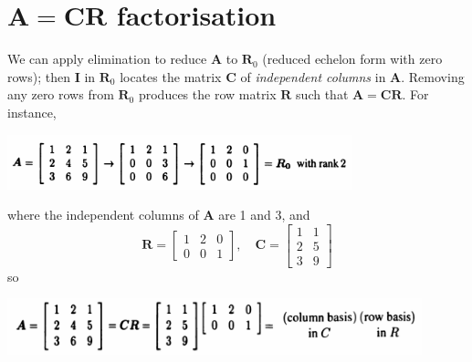 \documentclass{report}
\begin{document}
\section{$\bm A=\bm{CR}$ factorisation}
We can apply elimination to reduce $\bm A$ to $\bm R_0$ (reduced echelon form with zero rows); then 
$\bm I$ in $\bm R_0$ locates the matrix $\bm C$ of \textit{independent columns} in $\bm A$. Removing any zero rows from $\bm R_0$ produces 
the row matrix $\bm R$ such that $\bm A=\bm{CR}$. For instance, 
\begin{center}
\includegraphics[width=10cm]{30}
\end{center}
where the independent columns of $\bm A$ are 1 and 3, and
\begin{equation*}
\bm R=\left[\begin{array}{ccc}
1&2&0\\0&0&1
\end{array}\right],\quad
\bm C=\left[\begin{array}{cc}
1&1\\2&5\\3&9
\end{array}\right]
\end{equation*}
so
\begin{center}
\includegraphics[width=12cm]{29}
\end{center}
\newpage
\end{document}
